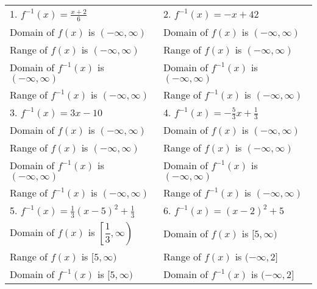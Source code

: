 \documentclass[11pt]{article}
\begin{document}
\begin{tabular}{p{0.5\linewidth}p{0.5\linewidth}}
1. $f^{-1}(x) = \frac{x+2}{6}$ &  
2. $f^{-1}(x) = -x + 42$  \\[0.15in]
    
Domain of $f(x)$ is $(-\infty, \infty)$ &   Domain of $f(x)$ is $(-\infty, \infty)$  \\[0.15in]
    
Range of $f(x)$ is $(-\infty, \infty)$  &   Range of $f(x)$ is $(-\infty, \infty)$  \\[0.15in]
    
Domain of $f^{-1}(x)$ is $(-\infty, \infty)$ &   Domain of $f^{-1}(x)$ is $(-\infty, \infty)$  \\[0.15in]
    
Range of $f^{-1}(x)$ is $(-\infty, \infty)$  &   Range of $f^{-1}(x)$ is $(-\infty, \infty)$  \\[0.35in]

    
3. $f^{-1}(x) = 3x - 10$    &
4. $f^{-1}(x) = -\frac{5}{3}x + \frac{1}{3}$    
\\[0.15in]
    
Domain of $f(x)$ is $(-\infty, \infty)$ &   Domain of $f(x)$ is $(-\infty, \infty)$  \\[0.15in]
    
Range of $f(x)$ is $(-\infty, \infty)$  &   Range of $f(x)$ is $(-\infty, \infty)$  \\[0.15in]
    
Domain of $f^{-1}(x)$ is $(-\infty, \infty)$ &   Domain of $f^{-1}(x)$ is $(-\infty, \infty)$  \\[0.15in]
    
Range of $f^{-1}(x)$ is $(-\infty, \infty)$  &   Range of $f^{-1}(x)$ is $(-\infty, \infty)$  \\[0.35in]


5. $f^{-1}(x) = \frac{1}{3}(x-5)^2 + \frac{1}{3}$   &
6. $f^{-1}(x) = (x-2)^2 + 5$    \\[0.15in]

Domain of $f(x)$ is $\left[\dfrac{1}{3}, \infty\right)$ &
Domain of $f(x)$ is $[5, \infty)$   \\[0.15in]


Range of $f(x)$ is $[5, \infty)$    &
Range of $f(x)$ is $(-\infty, 2]$   \\[0.15in]

Domain of $f^{-1}(x)$ is $[5, \infty)$  &
Domain of $f^{-1}(x)$ is $(-\infty, 2]$   \\[0.15in]
    

\end{tabular}
\end{document}
